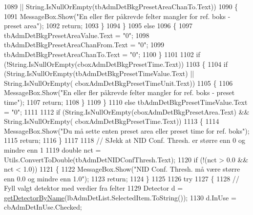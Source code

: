 \begin{DoxyCode}
1089                     || String.IsNullOrEmpty(tbAdmDetBkgPresetAreaChanTo.Text))
1090                 \{
1091                     MessageBox.Show(\textcolor{stringliteral}{"En eller fler påkrevde felter mangler for ref. boks - preset area"});
1092                     \textcolor{keywordflow}{return};
1093                 \}
1094             \}
1095             \textcolor{keywordflow}{else}
1096             \{
1097                 tbAdmDetBkgPresetAreaValue.Text = \textcolor{stringliteral}{"0"};
1098                 tbAdmDetBkgPresetAreaChanFrom.Text = \textcolor{stringliteral}{"0"};
1099                 tbAdmDetBkgPresetAreaChanTo.Text = \textcolor{stringliteral}{"0"};
1100             \}
1101 
1102             \textcolor{keywordflow}{if} (!String.IsNullOrEmpty(cboxAdmDetBkgPresetTime.Text))
1103             \{
1104                 \textcolor{keywordflow}{if} (String.IsNullOrEmpty(tbAdmDetBkgPresetTimeValue.Text) || String.IsNullOrEmpty(
      cboxAdmDetBkgPresetTimeUnit.Text))
1105                 \{
1106                     MessageBox.Show(\textcolor{stringliteral}{"En eller fler påkrevde felter mangler for ref. boks - preset time"});
1107                     \textcolor{keywordflow}{return};
1108                 \}
1109             \}
1110             \textcolor{keywordflow}{else} tbAdmDetBkgPresetTimeValue.Text = \textcolor{stringliteral}{"0"};
1111 
1112             \textcolor{keywordflow}{if} (String.IsNullOrEmpty(cboxAdmDetBkgPresetArea.Text) && String.IsNullOrEmpty(
      cboxAdmDetBkgPresetTime.Text))
1113             \{
1114                 MessageBox.Show(\textcolor{stringliteral}{"Du må sette enten preset area eller preset time for ref. boks"});
1115                 \textcolor{keywordflow}{return};
1116             \}
1117 
1118             \textcolor{comment}{// SJekk at NID Conf. Thresh. er større enn 0 og mindre enn 1}
1119             \textcolor{keywordtype}{double} nct = Utils.ConvertToDouble(tbAdmDetNIDConfThresh.Text);
1120             \textcolor{keywordflow}{if} (!(nct > 0.0 && nct < 1.0))
1121             \{
1122                 MessageBox.Show(\textcolor{stringliteral}{"NID Conf. Thresh. må være større enn 0.0 og mindre enn 1.0"});
1123                 \textcolor{keywordflow}{return};
1124             \}
1125 
1126             \textcolor{keywordflow}{try}
1127             \{
1128                 \textcolor{comment}{// Fyll valgt detektor med verdier fra felter}
1129                 Detector d = \hyperlink{class_scintilab_1_1_form_main_aff4482e0919480013a53fe56cfb374ba}{getDetectorByName}(lbAdmDetList.SelectedItem.ToString());
1130                 d.InUse = cbAdmDetInUse.Checked;

\end{DoxyCode}
